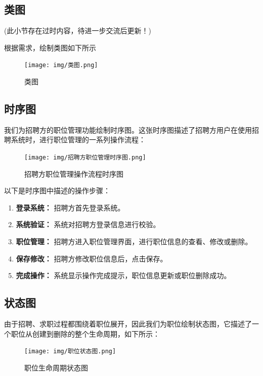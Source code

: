 \documentclass[UTF8,a4paper,10pt]{ctexart}
\begin{document}
\subsection{类图}

(此小节存在过时内容，待进一步交流后更新！)

根据需求，绘制类图如下所示

\begin{figure}[H]
    \centering
    \texttt{[image: img/类图.png]}
    \caption{类图}
    \label{fig:类图}
\end{figure}

\subsection{时序图}

我们为招聘方的职位管理功能绘制时序图。这张时序图描述了招聘方用户在使用招聘系统时，进行职位管理的一系列操作流程：

\begin{figure}[H]
    \centering
    \texttt{[image: img/招聘方职位管理时序图.png]} 
    \caption{招聘方职位管理操作流程时序图}
    \label{fig:招聘方职位管理时序图}
\end{figure}

以下是时序图中描述的操作步骤：

\begin{enumerate}
    \item \textbf{登录系统：} 招聘方首先登录系统。
    \item \textbf{系统验证：} 系统对招聘方登录信息进行校验。
    \item \textbf{职位管理：} 招聘方进入职位管理界面，进行职位信息的查看、修改或删除。
    \item \textbf{保存修改：} 招聘方修改职位信息后，点击保存。
    \item \textbf{完成操作：} 系统显示操作完成提示，职位信息更新或职位删除成功。
\end{enumerate}


\subsection{状态图}

由于招聘、求职过程都围绕着职位展开，因此我们为职位绘制状态图，它描述了一个职位从创建到删除的整个生命周期，如下所示：

\begin{figure}[H]
    \centering
    \texttt{[image: img/职位状态图.png]} 
    \caption{职位生命周期状态图}
    \label{fig:职位状态图}
\end{figure}
\end{document}
